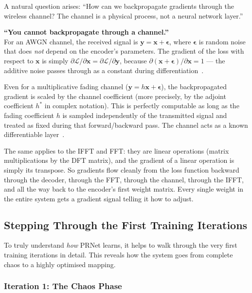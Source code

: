 A natural question arises: ``How can we backpropagate gradients through the wireless channel?  The channel is a physical process, not a neural network layer.''

\begin{misconception}
    \textbf{``You cannot backpropagate through a channel.''} \\
    For an AWGN channel, the received signal is $\bm{y} = \bm{x} + \bm{\epsilon}$, where $\bm{\epsilon}$ is random noise that does \emph{not} depend on the encoder's parameters. The gradient of the loss with respect to $\bm{x}$ is simply $\partial\mathcal{L}/\partial\bm{x} = \partial\mathcal{L}/\partial\bm{y}$, because $\partial(\bm{x} + \bm{\epsilon})/\partial\bm{x} = 1$ --- the additive noise passes through as a constant during differentiation~\cite{kim2017novel}.

    Even for a multiplicative fading channel ($\bm{y} = h\bm{x} + \bm{\epsilon}$), the backpropagated gradient is scaled by the channel coefficient (more precisely, by the adjoint coefficient $h^*$ in complex notation).  This is perfectly computable as long as the fading coefficient $h$ is sampled independently of the transmitted signal and treated as fixed during that forward/backward pass. The channel acts as a known differentiable layer~\cite{kim2017novel}.
\end{misconception}

The same applies to the IFFT and FFT: they are linear operations (matrix multiplications by the DFT matrix), and the gradient of a linear operation is simply its transpose.  So gradients flow cleanly from the loss function backward through the decoder, through the FFT, through the channel, through the IFFT, and all the way back to the encoder's first weight matrix.  Every single weight in the entire system gets a gradient signal telling it how to adjust.


\subsection{Stepping Through the First Training Iterations}

To truly understand \emph{how} PRNet learns, it helps to walk through the very first training iterations in detail.  This reveals how the system goes from complete chaos to a highly optimised mapping.

\subsubsection{Iteration 1: The Chaos Phase}

